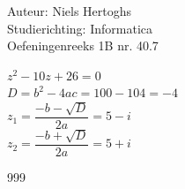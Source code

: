 \documentclass[a4paper]{article}
\begin{document}
  
\noindent \large Auteur: Niels Hertoghs       \\
\noindent \large Studierichting: Informatica   \\
\noindent \large Oefeningenreeks 1B nr. 40.7   \\

\medskip

\normalsize

$ z^2-10z+26 = 0$\\

$ D = b^2 - 4ac = 100 - 104 = -4$\\

$ z_1 = \dfrac{-b - \sqrt{D}}{2a} = 5 - i $\\

$ z_2 = \dfrac{-b + \sqrt{D}}{2a} = 5 + i $\\

\begin{thebibliography}{999}
\end{thebibliography}
\end{document}
